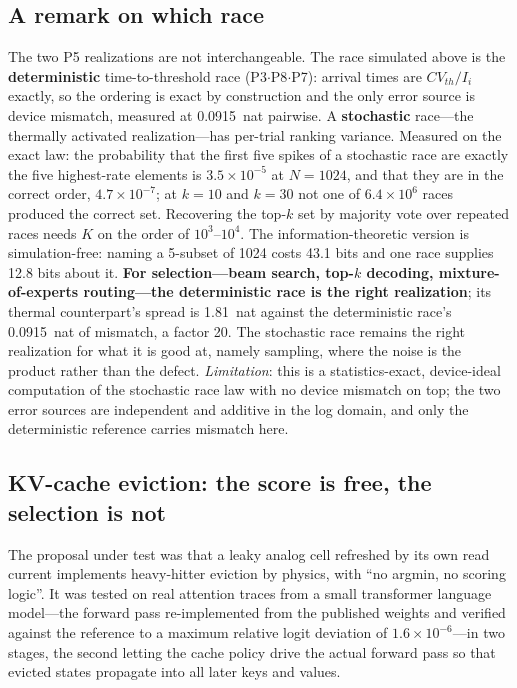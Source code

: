 \documentclass[11pt]{article}
\begin{document}
\subsection{A remark on which race}
\label{sec:race}

The two P5 realizations are not interchangeable. The race simulated above is the \textbf{deterministic} time-to-threshold race (P3$\cdot$P8$\cdot$P7): arrival times are $CV_{th}/I_i$ exactly, so the ordering is exact by construction and the only error source is device mismatch, measured at 0.0915~nat pairwise. A \textbf{stochastic} race---the thermally activated realization---has per-trial ranking variance. Measured on the exact law: the probability that the first five spikes of a stochastic race are exactly the five highest-rate elements is $3.5\times10^{-5}$ at $N = 1024$, and that they are in the correct order, $4.7\times10^{-7}$; at $k = 10$ and $k = 30$ not one of $6.4\times10^6$ races produced the correct set. Recovering the top-$k$ set by majority vote over repeated races needs $K$ on the order of $10^3$--$10^4$. The information-theoretic version is simulation-free: naming a 5-subset of 1024 costs 43.1 bits and one race supplies 12.8 bits about it. \textbf{For selection---beam search, top-$k$ decoding, mixture-of-experts routing---the deterministic race is the right realization}; its thermal counterpart's spread is 1.81~nat against the deterministic race's 0.0915~nat of mismatch, a factor 20. The stochastic race remains the right realization for what it is good at, namely sampling, where the noise is the product rather than the defect. \textit{Limitation}: this is a statistics-exact, device-ideal computation of the stochastic race law with no device mismatch on top; the two error sources are independent and additive in the log domain, and only the deterministic reference carries mismatch here.

\subsection{KV-cache eviction: the score is free, the selection is not}
\label{sec:kv}

The proposal under test was that a leaky analog cell refreshed by its own read current implements heavy-hitter eviction by physics, with ``no argmin, no scoring logic''. It was tested on real attention traces from a small transformer language model---the forward pass re-implemented from the published weights and verified against the reference to a maximum relative logit deviation of $1.6\times10^{-6}$---in two stages, the second letting the cache policy drive the actual forward pass so that evicted states propagate into all later keys and values.
\end{document}

